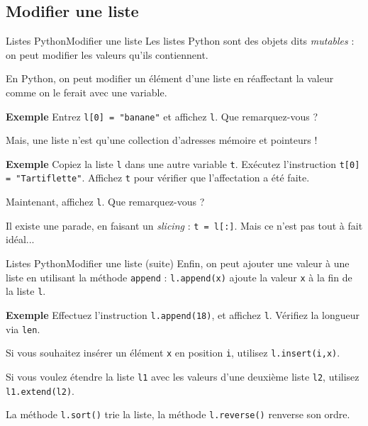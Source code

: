 \documentclass[10pt]{beamer}
\begin{document}
\subsection{Modifier une liste}

\begin{frame}[fragile]{Listes Python}{Modifier une liste}
	Les listes Python sont des objets dits \textit{mutables} : on peut modifier les valeurs qu'ils contiennent.
	\pause
	
	En Python, on peut modifier un élément d'une liste en réaffectant la valeur comme on le ferait avec une variable.
	\begin{block}{\textbf{Exemple}}
		Entrez \lstinline|l[0] = "banane"| et affichez \lstinline|l|. Que remarquez-vous ?
	\end{block}
	\pause
	
	Mais, une liste n'est qu'une collection d'adresses mémoire et pointeurs ! 
	\begin{block}{\textbf{Exemple}}
	Copiez la liste \lstinline|l| dans une autre variable \lstinline|t|. Exécutez l'instruction \lstinline|t[0] = "Tartiflette"|. Affichez \lstinline|t| pour vérifier que l'affectation a été faite.
	\pause
	
	Maintenant, affichez \lstinline|l|. Que remarquez-vous ?
	\end{block}
	
	Il existe une parade, en faisant un \textit{slicing} : \lstinline|t = l[:]|. Mais ce n'est pas tout à fait idéal...
\end{frame}

\begin{frame}[fragile]{Listes Python}{Modifier une liste (suite)}
	Enfin, on peut ajouter une valeur à une liste en utilisant la méthode \lstinline|append| : \lstinline|l.append(x)| ajoute la valeur \lstinline|x| à la fin de la liste \lstinline|l|.

	\begin{block}{\textbf{Exemple}}
		Effectuez l'instruction \lstinline|l.append(18)|, et affichez \lstinline|l|. Vérifiez la longueur via \lstinline|len|.
	\end{block}
	\pause
	
	Si vous souhaitez insérer un élément \lstinline|x| en position \lstinline|i|, utilisez \lstinline|l.insert(i,x)|.
	\pause
	
	Si vous voulez étendre la liste \lstinline|l1| avec les valeurs d'une deuxième liste \lstinline|l2|, utilisez \lstinline|l1.extend(l2)|.
	\pause
	
	La méthode \lstinline|l.sort()| trie la liste, la méthode \lstinline|l.reverse()| renverse son ordre.
\end{frame}
\end{document}
